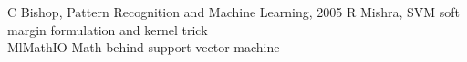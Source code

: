 \documentclass[11pt]{article}
\begin{document}
{


\begin{thebibliography}{9}
    C Bishop, Pattern Recognition and Machine Learning, 2005
    R Mishra, SVM soft margin formulation and kernel trick\\
    [\textit{https://towardsdatascience.com/support-vector-machines-soft-margin-formulation-and-kernel-trick-4c9729dc8efe}]
    MlMathIO Math behind support vector machine\\
    [\textit{https://medium.com/@ankitnitjsr13/math-behind-support-vector-machine-svm-5e7376d0ee4d}]
\end{thebibliography}

}



\end{document}
